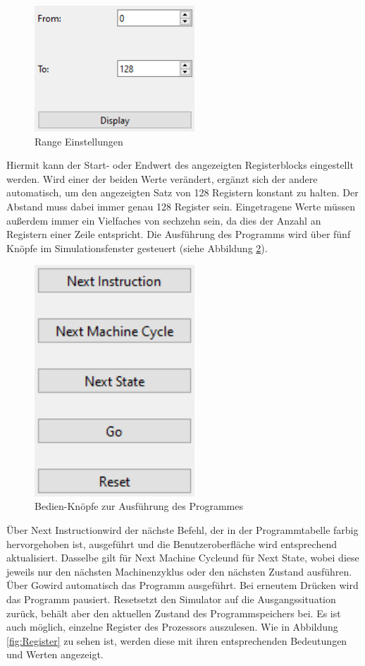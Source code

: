 \documentclass[12pt]{article}
\newcommand{\imgSpaceBefore}{\vspace{10pt}}
\begin{document}
\begin{figure}[h]
\centering
\includegraphics[width=6cm]{bilder/Range}
\caption{Range Einstellungen}
\label{fig:Range}
\end{figure}

\noindent
Hiermit kann der Start- oder Endwert des angezeigten Registerblocks eingestellt werden. Wird einer der beiden Werte verändert, ergänzt sich der andere automatisch, um den angezeigten Satz von 128 Registern konstant zu halten. Der Abstand muss dabei immer genau 128 Register sein. Eingetragene Werte müssen außerdem immer ein Vielfaches von sechzehn sein, da dies der Anzahl an Registern einer Zeile entspricht. Die Ausführung des Programms wird über fünf Knöpfe im Simulationsfenster gesteuert (siehe Abbildung \ref{fig:Bedienen}).\imgSpaceBefore

\begin{figure}[H]
\centering
\includegraphics[width=6cm]{bilder/Bedienen}
\caption{Bedien-Knöpfe zur Ausführung des Programmes}
\label{fig:Bedienen}
\end{figure}

\noindent
Über \glqq Next Instruction\grqq wird der nächste Befehl, der in der Programmtabelle farbig hervorgehoben ist, ausgeführt und die Benutzeroberfläche wird entsprechend aktualisiert. Dasselbe gilt für \glqq Next Machine Cycle\grqq und für \glqq Next State\grqq, wobei diese jeweils nur den nächsten Machinenzyklus oder den nächsten Zustand ausführen. Über \glqq Go\grqq wird automatisch das Programm ausgeführt. Bei erneutem Drücken wird das Programm pausiert. \glqq Reset\grqq setzt den Simulator auf die Ausgangssituation zurück, behält aber den aktuellen Zustand des Programmspeichers bei. Es ist auch möglich, einzelne Register des Prozessors auszulesen. Wie in Abbildung \ref{fig:Register} zu sehen ist, werden diese mit ihren entsprechenden Bedeutungen und Werten angezeigt.\imgSpaceBefore
\end{document}
